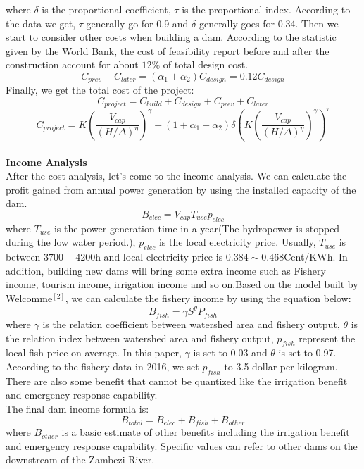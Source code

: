\documentclass{mcmthesis}
\begin{document}
where $\delta$ is the proportional coefficient, $\tau$ is the proportional index. According to the data we get, $\tau$ generally go for 0.9 and $\delta$ generally goes for 0.34.
\indent Then we start to consider other costs when building a dam. According to the statistic given by the World Bank, the cost of feasibility report before and after the construction account for about $12\%$ of total design cost.
\begin{equation}
C_{prev} + C_{later}= (\alpha_{1} + \alpha_{2})C_{design} = 0.12C_{design}
\end{equation}
Finally, we get the total cost of the project:
\begin{equation}
C_{project} = C_{build} + C_{design} + C_{prev} + C_{later}
\end{equation}
\begin{equation}
C_{project} = K(\frac{V_{cap}}{(H/\Delta)^{\eta}})^{\gamma} + (1+\alpha_{1}+\alpha_{2}){\delta}(K(\frac{V_{cap}}{(H/\Delta)^{\eta}})^{\gamma})^{\tau}
\end{equation}\\

\textbf{Income Analysis}\\
\indent After the cost analysis, let's come to the income analysis. We can calculate the profit gained from annual power generation by using the installed capacity of the dam. 
\begin{equation}
B_{elec} = V_{cap}T_{use}p_{elec}
\end{equation}
where $T_{use}$ is the power-generation time in a year(The hydropower is stopped during the low water period.),  $p_{elec}$ is the local electricity price. Usually, $T_{use}$ is between $3700-4200$h and local electricity price is $0.384\sim0.468$Cent/KWh.
In addition, building new dams will bring some extra income such as Fishery income, tourism income, irrigation income and so on.Based on the model built by Welcomme$^{[2]}$, we can calculate the fishery income by using the equation below:
\begin{equation}
B_{fish} = {\gamma}S^{\theta}P_{fish}
\end{equation}
where $\gamma$ is the relation coefficient between watershed area and fishery output, $\theta$ is the relation index between watershed area and fishery output, $p_{fish}$ represent the local fish price on average. In this paper, $\gamma$ is set to 0.03 and $\theta$ is set to 0.97. According to the fishery data in 2016, we set $p_{fish}$ to 3.5 dollar per kilogram. There are also some benefit that cannot be quantized like the irrigation benefit and emergency response capability. \\
The final dam income formula is:
\begin{equation}
B_{total} = B_{elec} + B_{fish} + B_{other}
\end{equation}
where $B_{other}$ is a basic estimate of other benefits including the irrigation benefit and emergency response capability. Specific values can refer to other dams on the downstream of the Zambezi River.
\end{document}
